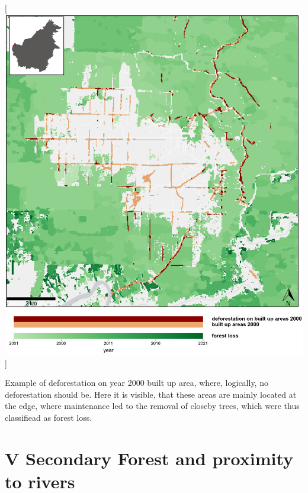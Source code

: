 \documentclass[
  letterpaper,
  DIV=11,
  numbers=noendperiod]{scrreprt}
\begin{document}

\color{white}

{[}\includegraphics[width=1\textwidth,height=\textheight]{text/../code/results/maps/validation_built_up_deforestation.png}{]}
\normalcolor

Example of deforestation on year 2000 built up area, where, logically,
no deforestation should be. Here it is visible, that these areas are
mainly located at the edge, where maintenance led to the removal of
closeby trees, which were thus classifiead as forest loss. \newpage

\hypertarget{secondary-forest-and-proximity-to-rivers}{%
\section*{\texorpdfstring{\textsc{V} Secondary Forest and proximity to
rivers}{ Secondary Forest and proximity to rivers}}\label{secondary-forest-and-proximity-to-rivers}}


\color{white}
\end{document}
